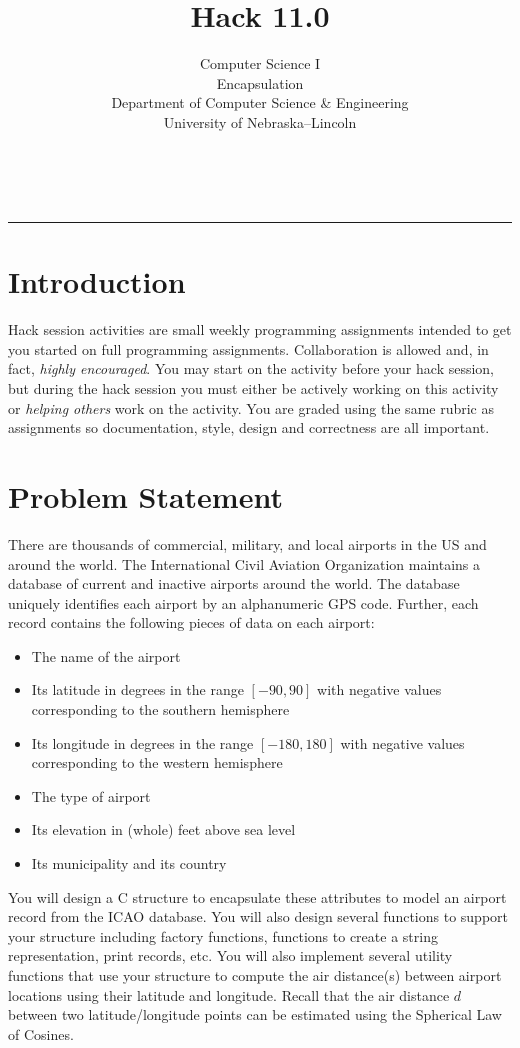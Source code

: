 \documentclass[12pt]{scrartcl}
\title{Hack 11.0}\let\Title\@title
\subtitle{Computer Science I\\
Encapsulation\\
{\small
\vskip1cm
Department of Computer Science \& Engineering \\
University of Nebraska--Lincoln}
\vskip-3cm}
\date{~}
\begin{document}
\maketitle

\hrule

\section*{Introduction}

Hack session activities are small weekly programming assignments intended
to get you started on full programming assignments.  Collaboration is allowed
and, in fact, \emph{highly encouraged}.  You may start on the activity before
your hack session, but during the hack session you must either be actively 
working on this activity or \emph{helping others} work on the activity.
You are graded using the same rubric as assignments so documentation, style, 
design and correctness are all important.  

\section*{Problem Statement}

There are thousands of commercial, military, and local airports in the US and
around the world.  The International Civil Aviation Organization maintains a
database of current and inactive airports around the world.  The database 
uniquely identifies each airport by an alphanumeric GPS code.  Further, each
record contains the following pieces of data on each airport:
\begin{itemize}
  \item The name of the airport
  \item Its latitude in degrees in the range $[-90, 90]$ with negative values corresponding to the southern hemisphere
  \item Its longitude in degrees in the range $[-180, 180]$ with negative values corresponding to the western hemisphere
  \item The type of airport 
  \item Its elevation in (whole) feet above sea level
  \item Its municipality and its country
\end{itemize}

You will design a C structure to encapsulate these attributes to model an
airport record from the ICAO database.  You will also design several functions
to support your structure including factory functions, functions to 
create a string representation, print records, etc. You will also implement
several utility functions that use your structure to compute the air
distance(s) between airport locations using their latitude and longitude.
Recall that the air distance $d$ between two latitude/longitude points can be 
estimated using the Spherical Law of Cosines.
\end{document}
